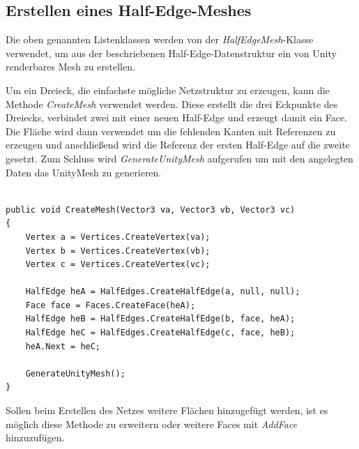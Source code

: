 \subsection{Erstellen eines Half-Edge-Meshes}
Die oben genannten Listenklassen werden von der \textit{HalfEdgeMesh}-Klasse verwendet, um aus der beschriebenen Half-Edge-Datenstruktur ein von Unity renderbares Mesh zu erstellen. 

Um ein Dreieck, die einfachste m\"ogliche Netzstruktur zu erzeugen, kann die Methode \textit{CreateMesh} verwendet werden. Diese erstellt die drei Eckpunkte des Dreiecks, verbindet zwei mit einer neuen Half-Edge und erzeugt damit ein Face. Die Fl\"ache wird dann verwendet um die fehlenden Kanten mit Referenzen zu erzeugen und anschlie{\ss}end wird die Referenz der ersten Half-Edge auf die zweite gesetzt. Zum Schluss wird \textit{GenerateUnityMesh} aufgerufen um mit den angelegten Daten das UnityMesh zu generieren.
\begin{lstlisting}

public void CreateMesh(Vector3 va, Vector3 vb, Vector3 vc)
{
	Vertex a = Vertices.CreateVertex(va);
	Vertex b = Vertices.CreateVertex(vb);
	Vertex c = Vertices.CreateVertex(vc);

	HalfEdge heA = HalfEdges.CreateHalfEdge(a, null, null);
	Face face = Faces.CreateFace(heA);
	HalfEdge heB = HalfEdges.CreateHalfEdge(b, face, heA);
	HalfEdge heC = HalfEdges.CreateHalfEdge(c, face, heB);
	heA.Next = heC;

	GenerateUnityMesh();
}

\end{lstlisting}
Sollen beim Erstellen des Netzes weitere Fl\"achen hinzugef\"ugt werden, ist es m\"oglich diese Methode zu erweitern oder weitere Faces mit \textit{AddFace} hinzuzuf\"ugen.


